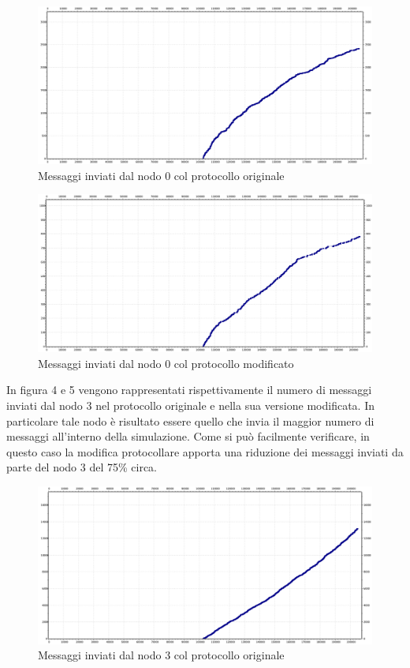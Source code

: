 \documentclass[	
	DIV=calc,
	paper=a4,
	fontsize=11pt,
	onecolumn
]{scrartcl} %
\begin{document}
\begin{figure}[H]
	\centering
	\includegraphics[scale=0.35]{TwoThousandNodesNode0.png}
	\caption{Messaggi inviati dal nodo 0 col protocollo originale}
	\label{Figura 2}
\end{figure}
\begin{figure}[H]
	\centering
	\includegraphics[scale=0.35]{TwoThousandNodesNode0Mod.png}
	\caption{Messaggi inviati dal nodo 0 col protocollo modificato}
	\label{Figura 3}
\end{figure}

In figura 4 e 5 vengono rappresentati rispettivamente il numero di messaggi inviati dal nodo 3 nel protocollo originale e nella sua versione modificata. In particolare tale nodo è risultato essere quello che invia il maggior numero di messaggi all'interno della simulazione. Come si può facilmente verificare, in questo caso la modifica protocollare apporta una riduzione dei messaggi inviati da parte del nodo 3 del 75\% circa. 

\begin{figure}[H]
	\centering
	\includegraphics[scale=0.35]{TwoThousandNodesNode3.png}
	\caption{Messaggi inviati dal nodo 3 col protocollo originale}
	\label{Figura 4}
\end{figure}
\end{document}
